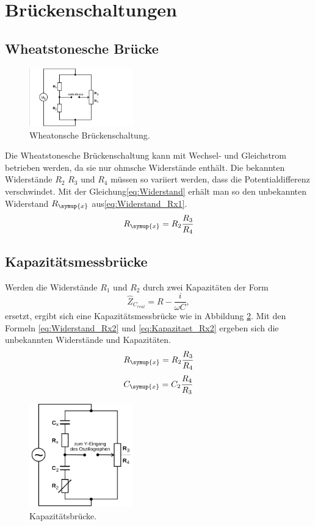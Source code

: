 \section{Brückenschaltungen}
\subsection{Wheatstonesche Brücke}
\begin{figure}
  \centering
  \includegraphics[width=0.4\textwidth]{Bilder/Wheatonsche.png}
  \caption{Wheatonsche Brückenschaltung\cite{sample}.}
  \label{fig:wheatonsche}
\end{figure}
Die Wheatstonesche Brückenschaltung kann mit Wechsel- und Gleichstrom betrieben werden,
da sie nur ohmsche Widerstände enthält. Die bekannten Widerstände $R_2$ $R_3$ und $R_4$
 müssen so variiert werden, dass die Potentialdifferenz verschwindet. Mit der
Gleichung\eqref{eq:Widerstand} erhält man so den unbekannten Widerstand $R_\symup{x}$
aus\eqref{eq:Widerstand_Rx1}.
\begin{equation}
R_\symup{x}=R_2 \frac{R_3}{R_4}
\label{eq:Widerstand_Rx1}
\end{equation}
\subsection{Kapazitätsmessbrücke}
Werden die Widerstände $R_1$ und $R_2$ durch zwei Kapazitäten der Form
\begin{equation}
\hat{Z}_{C_{real}}=R-\frac{i}{\omega C}  ,
\end{equation}
ersetzt, ergibt sich eine Kapazitätsmessbrücke wie in Abbildung \ref{fig:capbruecke}.
Mit den Formeln \eqref{eq:Widerstand_Rx2} und \eqref{eq:Kapazitaet_Rx2} ergeben
sich die unbekannten Widerstände und Kapazitäten.
\begin{equation}
R_\symup{x}=R_2\frac{R_3}{R_4}
\label{eq:Widerstand_Rx2}
\end{equation}
\begin{equation}
C_\symup{x}=C_2\frac{R_4}{R_3}
\label{eq:Kapazitaet_Rx2}
\end{equation}
\begin{figure}
  \centering
  \includegraphics[width=0.4\textwidth]{Bilder/Capazitaetsbruecke.png}
  \caption{Kapazitätsbrücke\cite{sample}.}
  \label{fig:capbruecke}
\end{figure}
